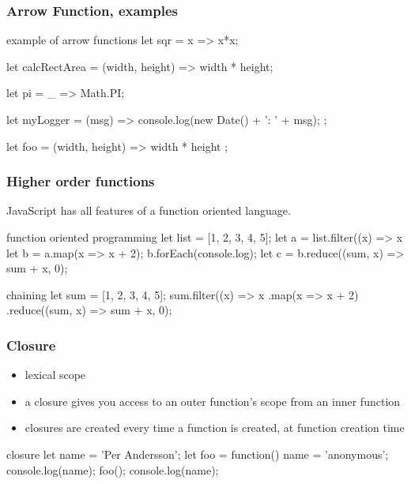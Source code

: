 \begin{frame}[fragile] \frametitle{Arrow Function, examples}

\begin{CodeBox}{example of arrow functions}
let sqr = x => x*x;

let calcRectArea = (width, height) => width * height;

let pi = _ => Math.PI;

let myLogger = (msg) => {
  console.log(new Date() + ': ' + msg); 
};

let foo = (width, height) => { width * height };
\end{CodeBox}
\end{frame}

\begin{frame}[fragile] \frametitle{Higher order functions}

JavaScript has all features of a function oriented language.

\begin{CodeBox}{function oriented programming}
let list = [1, 2, 3, 4, 5];
let a = list.filter((x) => x %
let b = a.map(x => x + 2);
b.forEach(console.log);
let c = b.reduce((sum, x) => sum + x, 0);
\end{CodeBox}
\begin{CodeBox}{chaining}
let sum = [1, 2, 3, 4, 5];
sum.filter((x) => x %
.map(x => x + 2)
.reduce((sum, x) => sum + x, 0);
\end{CodeBox}
\end{frame}

\begin{frame}[fragile] \frametitle{Closure}

\begin{itemize}
  \item lexical scope
  \item a closure gives you access to an outer function’s scope from an inner function
  \item closures are created every time a function is created, at function creation time
\end{itemize}
\vspace{5mm}

\begin{CodeBox}{closure}
let name = 'Per Andersson';
let foo = function() {
  name = 'anonymous';
}
console.log(name);
foo();
console.log(name);
\end{CodeBox}
\end{frame}

